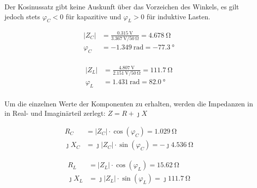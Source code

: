 Der Kosinussatz gibt keine Auskunft über das Vorzeichen des Winkels, es gilt jedoch stets $\varphi_C < 0$ für kapazitive und $\varphi_L > 0$ für induktive Lasten.

\begin{minipage}[t]{0.48\textwidth}

	\[
		\begin{aligned}
			|Z_C|     & = \frac{\SI{0.315}{\volt}}{\SI{3.367}{\volt}/\SI{50}{\ohm}} = \SI{4.678}{\ohm} \\
			\varphi_C & = \SI{-1.349}{\radian} = \SI{-77.3}{\degree}                                   \\
		\end{aligned}
	\]
\end{minipage}\hfill
\begin{minipage}[t]{0.48\textwidth}

	\[
		\begin{aligned}
			|Z_L|     & = \frac{\SI{4.807}{\volt}}{\SI{2.151}{\volt}/\SI{50}{\ohm}} = \SI{111.7}{\ohm} \\
			\varphi_L & = \SI{1.431}{\radian} = \SI{82.0}{\degree}                                     \\
		\end{aligned}
	\]
\end{minipage}

\marginref{\ref{itm:1-P4-3}}
Um die einzelnen Werte der Komponenten zu erhalten, werden die Impedanzen in in
Real- und Imaginärteil zerlegt: $Z = R + \jmath X$

\begin{minipage}[position]{0.48\textwidth}

	\[
		\begin{aligned}
			R_C        & = |Z_C| \cdot \cos(\varphi_C) = \SI{1.029}{\ohm}               \\
			\jmath X_C & = \jmath |Z_C| \cdot \sin(\varphi_C) = -\jmath\SI{4.536}{\ohm}
		\end{aligned}
	\]
\end{minipage}\hfill
\begin{minipage}[position]{0.48\textwidth}

	\[
		\begin{aligned}
			R_L        & = |Z_L| \cdot \cos(\varphi_L) = \SI{15.62}{\ohm}              \\
			\jmath X_L & = \jmath |Z_L| \cdot \sin(\varphi_L) = \jmath\SI{111.7}{\ohm}
		\end{aligned}
	\]
\end{minipage}

